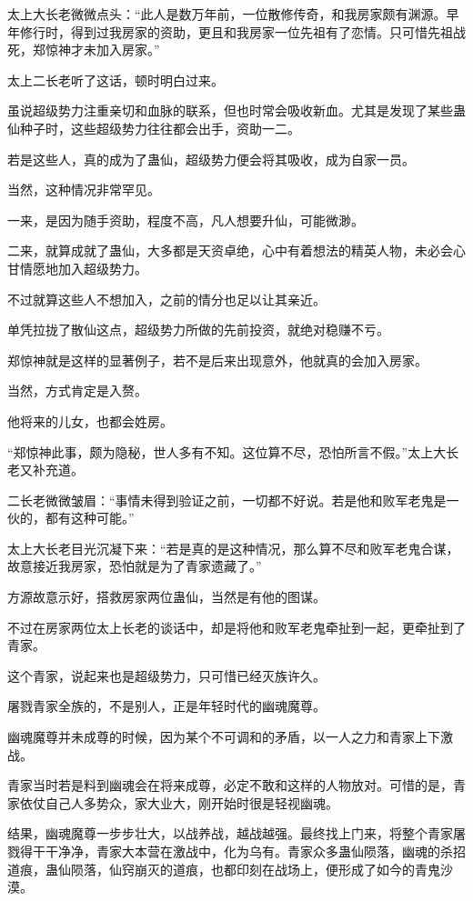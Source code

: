 \begin{this_body}
太上大长老微微点头：“此人是数万年前，一位散修传奇，和我房家颇有渊源。早年修行时，得到过我房家的资助，更且和我房家一位先祖有了恋情。只可惜先祖战死，郑惊神才未加入房家。”

太上二长老听了这话，顿时明白过来。

虽说超级势力注重亲切和血脉的联系，但也时常会吸收新血。尤其是发现了某些蛊仙种子时，这些超级势力往往都会出手，资助一二。

若是这些人，真的成为了蛊仙，超级势力便会将其吸收，成为自家一员。

当然，这种情况非常罕见。

一来，是因为随手资助，程度不高，凡人想要升仙，可能微渺。

二来，就算成就了蛊仙，大多都是天资卓绝，心中有着想法的精英人物，未必会心甘情愿地加入超级势力。

不过就算这些人不想加入，之前的情分也足以让其亲近。

单凭拉拢了散仙这点，超级势力所做的先前投资，就绝对稳赚不亏。

郑惊神就是这样的显著例子，若不是后来出现意外，他就真的会加入房家。

当然，方式肯定是入赘。

他将来的儿女，也都会姓房。

“郑惊神此事，颇为隐秘，世人多有不知。这位算不尽，恐怕所言不假。”太上大长老又补充道。

二长老微微皱眉：“事情未得到验证之前，一切都不好说。若是他和败军老鬼是一伙的，都有这种可能。”

太上大长老目光沉凝下来：“若是真的是这种情况，那么算不尽和败军老鬼合谋，故意接近我房家，恐怕就是为了青家遗藏了。”

方源故意示好，搭救房家两位蛊仙，当然是有他的图谋。

不过在房家两位太上长老的谈话中，却是将他和败军老鬼牵扯到一起，更牵扯到了青家。

这个青家，说起来也是超级势力，只可惜已经灭族许久。

屠戮青家全族的，不是别人，正是年轻时代的幽魂魔尊。

幽魂魔尊并未成尊的时候，因为某个不可调和的矛盾，以一人之力和青家上下激战。

青家当时若是料到幽魂会在将来成尊，必定不敢和这样的人物放对。可惜的是，青家依仗自己人多势众，家大业大，刚开始时很是轻视幽魂。

结果，幽魂魔尊一步步壮大，以战养战，越战越强。最终找上门来，将整个青家屠戮得干干净净，青家大本营在激战中，化为乌有。青家众多蛊仙陨落，幽魂的杀招道痕，蛊仙陨落，仙窍崩灭的道痕，也都印刻在战场上，便形成了如今的青鬼沙漠。


\end{this_body}

